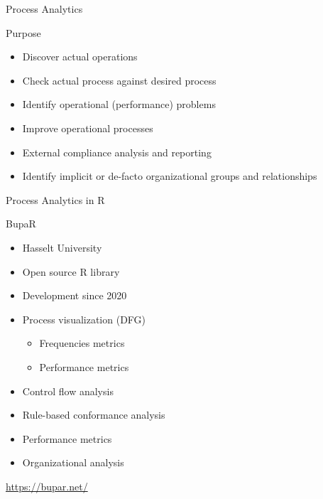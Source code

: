 \documentclass[ignorenonframetext,xcolor=x11names]{beamer}
\begin{document}
\begin{frame}[label=full]{Process Analytics}
\begin{block}{Purpose}
\begin{itemize}
   \item Discover actual operations
   \item Check actual process against desired process
   \item Identify operational (performance) problems
   \item Improve operational processes
   \item External compliance analysis and reporting
   \item Identify implicit or de-facto organizational groups and relationships 
\end{itemize}
\end{block}
\end{frame}

\begin{frame}[label=withcode]{Process Analytics in R}
\begin{block}{BupaR}
\begin{itemize}
   \item Hasselt University
   \item Open source R library
   \item Development since 2020
   \item Process visualization (DFG)
   \begin{itemize}
      \item Frequencies metrics
      \item Performance metrics
   \end{itemize}
   \item Control flow analysis
   \item Rule-based conformance analysis
   \item Performance metrics
   \item Organizational analysis
\end{itemize}
\end{block}
\vspace{.5\baselineskip}
\url{https://bupar.net/}

\end{frame}
\end{document}
